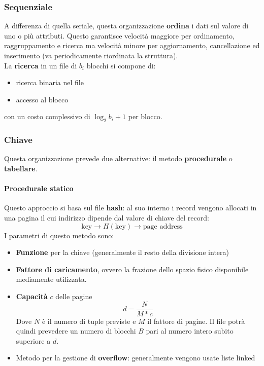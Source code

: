 \subsubsection{Sequenziale}
A differenza di quella seriale, questa organizzazione \textbf{ordina} i dati sul valore di uno o più attributi. Questo garantisce velocità maggiore per ordinamento, raggruppamento e ricerca ma velocità minore per aggiornamento, cancellazione ed inserimento (va periodicamente riordinata la struttura).\\
La \textbf{ricerca} in un file di $b_i$ blocchi si compone di:
\begin{itemize}
	\item ricerca binaria nel file
	\item accesso al blocco
\end{itemize}
con un costo complessivo di $\log_2{b_i}+1$ per blocco.

\subsubsection{Chiave}
Questa organizzazione prevede due alternative: il metodo \textbf{procedurale} o \textbf{tabellare}.

\paragraph{Procedurale statico}
Questo approccio si basa sul file \textbf{hash}: al suo interno i record vengono allocati in una pagina il cui indirizzo dipende dal valore di chiave del record:
\begin{equation*}
	\text{key} \longrightarrow H(\text{key}) \longrightarrow \text{page address}
\end{equation*}
I parametri di questo metodo sono:
\begin{itemize}
	\item \textbf{Funzione} per la chiave (generalmente il resto della divisione intera)
	\item \textbf{Fattore di caricamento}, ovvero la frazione dello spazio fisico disponibile mediamente utilizzata.
	\item \textbf{Capacità} $c$ delle pagine
	\begin{equation}
		d = \frac{N}{M * c}
	\end{equation}
	Dove $N$ è il numero di tuple previste e $M$ il fattore di pagine. Il file potrà quindi prevedere un numero di blocchi $B$ pari al numero intero subito superiore a $d$.
	\item Metodo per la gestione di \textbf{overflow}: generalmente vengono usate liste linked
\end{itemize}

